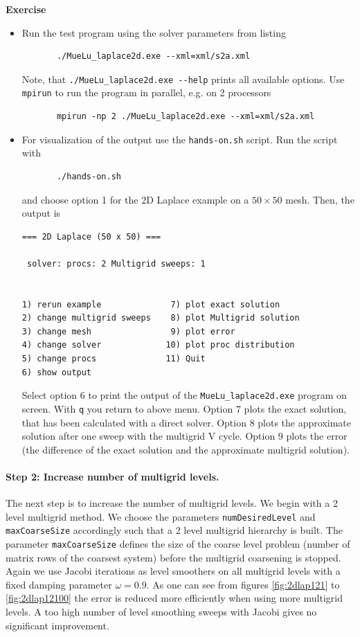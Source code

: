 \documentclass[12pt,a4paper]{article}
\begin{document}
\begin{graybox}
 \textbf{Exercise}
 \begin{itemize}
 \item Run the test program using the solver parameters from listing%
       \begin{verbatim}
       ./MueLu_laplace2d.exe --xml=xml/s2a.xml
       \end{verbatim}
       Note, that \verb|./MueLu_laplace2d.exe --help| prints all available options. Use \verb|mpirun| to run the program in parallel, e.g. on 2 processors
       \begin{verbatim}
       mpirun -np 2 ./MueLu_laplace2d.exe --xml=xml/s2a.xml
       \end{verbatim}
 \item For visualization of the output use the \verb|hands-on.sh| script. Run the script with
       \begin{verbatim}
       ./hands-on.sh
       \end{verbatim}
       and choose option 1 for the 2D Laplace example on a $50\times 50$ mesh. Then, the output is
       \begin{verbatim}
=== 2D Laplace (50 x 50) === 

 solver: procs: 2 Multigrid sweeps: 1


1) rerun example              7) plot exact solution
2) change multigrid sweeps    8) plot Multigrid solution
3) change mesh                9) plot error
4) change solver             10) plot proc distribution
5) change procs              11) Quit
6) show output
       \end{verbatim}
       Select option 6 to print the output of the \verb|MueLu_laplace2d.exe| program on screen. With \verb|q| you return to above menu. Option 7 plots the exact solution, that has been calculated with a direct solver. Option 8 plots the approximate solution after one sweep with the multigrid V cycle. Option 9 plots the error (the difference of the exact solution and the approximate multigrid solution).
 \end{itemize}
 \end{graybox}

\paragraph{Step 2: Increase number of multigrid levels.}
The next step is to increase the number of multigrid levels. We begin with a 2 level multigrid method. We choose the parameters \texttt{numDesiredLevel} and \texttt{maxCoarseSize} accordingly such that a 2 level multigrid hierarchy is built. The parameter \texttt{maxCoarseSize} defines the size of the coarse level problem (number of matrix rows of the coarsest system) before the multigrid coarsening is stopped. Again we use Jacobi iterations as level smoothers on all multigrid levels with a fixed damping parameter $\omega=0.9$.
As one can see from figures  \ref{fig:2dlap121} to \ref{fig:2dlap12100} the error is reduced more efficiently when using more multigrid levels. A too high number of level smoothing sweeps with Jacobi gives no significant improvement.
\end{document}
